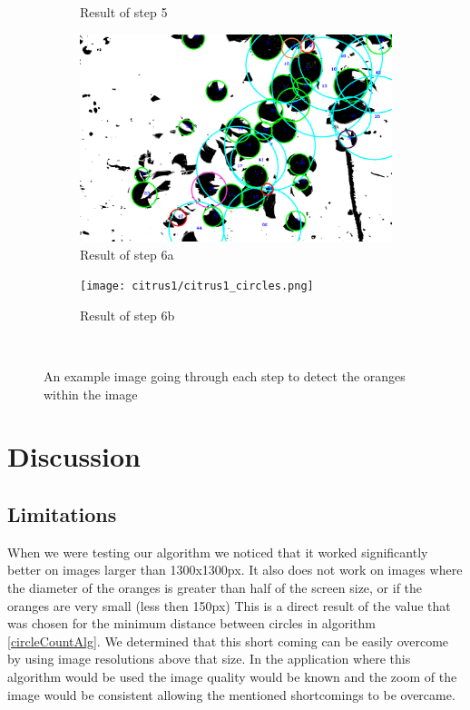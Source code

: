 \documentclass[conference]{IEEEtran}
\begin{document}
\begin{figure}[H]
\begin{subfigure}{.3\linewidth}
  	\caption{Result of step 5}
  \end{subfigure}\par\medskip
  \begin{subfigure}{.49\linewidth}
  	\includegraphics[width=\linewidth]{citrus1/citrus1_circles_mask.png}\hfill
	   	\caption{Result of step 6a}
  \end{subfigure}
  \begin{subfigure}{.49\linewidth}
  	\texttt{[image: citrus1/citrus1\_circles.png]}\hfill
 	 \caption{Result of step 6b}
  \end{subfigure}
  \caption{An example image going through each step to detect the oranges within the image} \
\end{figure}


\section{Discussion}

\subsection{Limitations} \label{sec:limitations}

When we were testing our algorithm we noticed that it worked significantly better on images larger than 1300x1300px. It also does not work on images where the diameter of the oranges is greater than half of the screen size, or if the oranges are very small (less then 150px) This is a direct result of the value that was chosen for the minimum distance between circles in algorithm \ref{circleCountAlg}. We determined that this short coming can be easily overcome by using image resolutions above that size. In the application where this algorithm would be used the image quality would be known and the zoom of the image would be consistent allowing the mentioned shortcomings to be overcame. 
\end{document}
